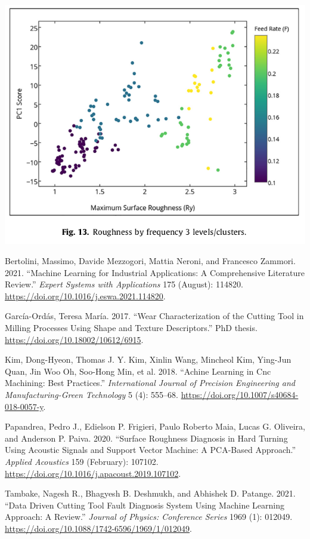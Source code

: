 \documentclass[
  letterpaper,
  DIV=11,
  numbers=noendperiod]{scrartcl}
\newlength{\cslhangindent}
\newlength{\cslentryspacingunit} %
\newenvironment{CSLReferences}[2] %
 {%
  \setlength{\parindent}{0pt}
  \ifodd #1
  \let\oldpar\par
  \def\par{\hangindent=\cslhangindent\oldpar}
  \fi
  \setlength{\parskip}{#2\cslentryspacingunit}
 }%
 {}
\begin{document}
\includegraphics{img/2023-01-07-12-16-33.png}

\hypertarget{refs}{}
\begin{CSLReferences}{1}{0}
\leavevmode{}%
Bertolini, Massimo, Davide Mezzogori, Mattia Neroni, and Francesco
Zammori. 2021. {``Machine {Learning} for Industrial Applications: {A}
Comprehensive Literature Review.''} \emph{Expert Systems with
Applications} 175 (August): 114820.
\url{https://doi.org/10.1016/j.eswa.2021.114820}.

\leavevmode{}%
García-Ordás, Teresa María. 2017. {``Wear Characterization of the
Cutting Tool in Milling Processes Using Shape and Texture
Descriptors.''} PhD thesis. \url{https://doi.org/10.18002/10612/6915}.

\leavevmode{}%
Kim, Dong-Hyeon, Thomas J. Y. Kim, Xinlin Wang, Mincheol Kim, Ying-Jun
Quan, Jin Woo Oh, Soo-Hong Min, et al. 2018. {``Achine Learning in Cnc
Machining: Best Practices.''} \emph{International Journal of Precision
Engineering and Manufacturing-Green Technology} 5 (4): 555--68.
\url{https://doi.org/10.1007/s40684-018-0057-y}.

\leavevmode{}%
Papandrea, Pedro J., Edielson P. Frigieri, Paulo Roberto Maia, Lucas G.
Oliveira, and Anderson P. Paiva. 2020. {``Surface Roughness Diagnosis in
Hard Turning Using Acoustic Signals and Support Vector Machine: {A}
{PCA}-Based Approach.''} \emph{Applied Acoustics} 159 (February):
107102. \url{https://doi.org/10.1016/j.apacoust.2019.107102}.

\leavevmode{}%
Tambake, Nagesh R., Bhagyesh B. Deshmukh, and Abhishek D. Patange. 2021.
{``Data {Driven} {Cutting} {Tool} {Fault} {Diagnosis} {System} {Using}
{Machine} {Learning} {Approach}: {A} {Review}.''} \emph{Journal of
Physics: Conference Series} 1969 (1): 012049.
\url{https://doi.org/10.1088/1742-6596/1969/1/012049}.

\end{CSLReferences}
\end{document}
